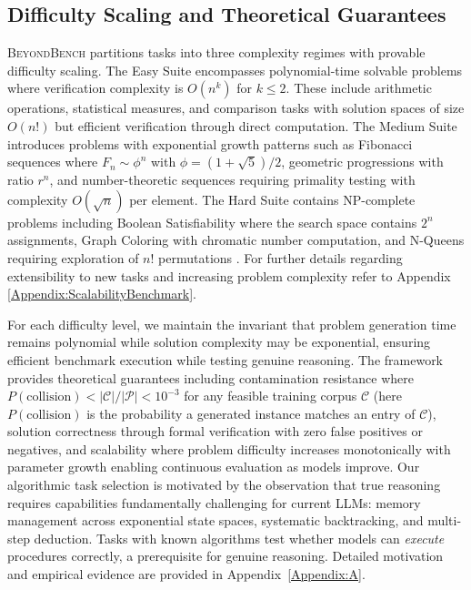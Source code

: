 \documentclass{article} %
\theoremstyle{plain}
\theoremstyle{definition}
\newcommand{\our}{\textsc{BeyondBench}\xspace}
\newcommand{\rebuttal}[1]{{\color{RebuttalGreen}#1}}
\begin{document}
\vspace{-0.5em}

\subsection{Difficulty Scaling and Theoretical Guarantees}

\our partitions tasks into three complexity regimes with provable difficulty scaling. The Easy Suite encompasses polynomial-time solvable problems where verification complexity is $O(n^k)$ for $k \leq 2$. These include arithmetic operations, statistical measures, and comparison tasks with solution spaces of size $O(n!)$ but efficient verification through direct computation. The Medium Suite introduces problems with exponential growth patterns such as Fibonacci sequences where $F_n \sim \phi^n$ with $\phi = (1+\sqrt{5})/2$, geometric progressions with ratio $r^n$, and number-theoretic sequences requiring primality testing with complexity $O(\sqrt{n})$ per element. The Hard Suite contains NP-complete problems \citep{fan-etal-2024-nphardeval, leyton2014understanding, kendall2008survey} including Boolean Satisfiability where the search space contains $2^n$ assignments, Graph Coloring with chromatic number computation, and N-Queens requiring exploration of $n!$ permutations \citep{yang2025nondeterministicpolynomialtimeproblemchallenge}. For further details regarding extensibility to new tasks and increasing problem complexity refer to Appendix \ref{Appendix:ScalabilityBenchmark}.


For each difficulty level, we maintain the invariant that problem generation time remains polynomial while solution complexity may be exponential, ensuring efficient benchmark execution while testing genuine reasoning. The framework provides theoretical guarantees including contamination resistance where $P(\text{collision}) < |\mathcal{C}|/|\mathcal{P}| < 10^{-3}$ for any feasible training corpus $\mathcal{C}$ (here $P(\text{collision})$ is the probability a generated instance matches an entry of $\mathcal{C}$), solution correctness through formal verification with zero false positives or negatives, and scalability where problem difficulty increases monotonically with parameter growth enabling continuous evaluation as models improve. \rebuttal{Our algorithmic task selection is motivated by the observation that true reasoning requires capabilities fundamentally challenging for current LLMs: memory management across exponential state spaces, systematic backtracking, and multi-step deduction. Tasks with known algorithms test whether models can \textit{execute} procedures correctly, a prerequisite for genuine reasoning. Detailed motivation and empirical evidence are provided in Appendix~\ref{Appendix:A}.} 
\end{document}
